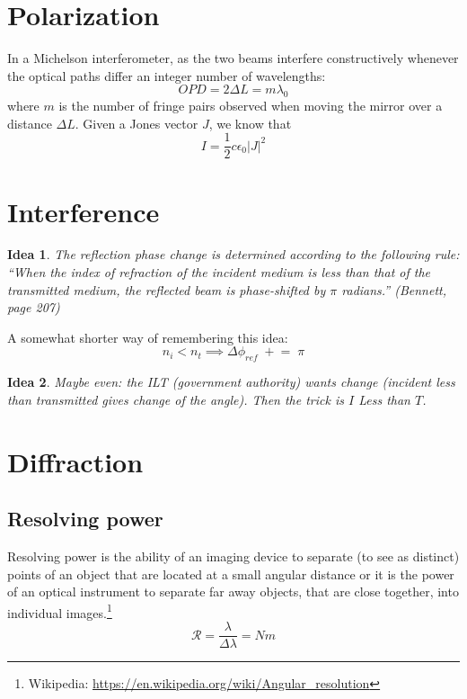 \documentclass{article}
\newtheorem*{idea}{Idea}
\begin{document}
\section{Polarization}
\noindent{}In a Michelson interferometer, as the two beams interfere constructively whenever the optical paths differ an integer number of wavelengths: $$OPD=2\Delta L = m \lambda_0$$
where $m$ is the number of fringe pairs observed when moving the mirror over a distance $\Delta L$.
\newline\newline
Given a Jones vector $J$, we know that
\begin{equation}
    I=\frac{1}{2} c \epsilon_0 \left|J\right|^2
\end{equation}
\iffalse
\noindent
A wave plate is defined to change the polarization state of a wave passing through it.
This means that the definition of a half-wave plate, for example, is that it changes the polarization angle of the light along the slow axis by $\pi$.
The definition \textbf{does not} state that a delay of $\frac{1}{2}\lambda$ is induced along the slow axis (although this is usually the case (especially, the plate does not induce a delay of $\frac{1}{2}\lambda_0$).
\fi
\section{Interference}
\begin{idea}
The reflection phase change is determined according to the following rule:
``When the index of refraction of the incident medium is less than that of the transmitted medium, the reflected beam is phase-shifted by $\pi$ radians.'' (Bennett, page 207)
\end{idea}
\noindent{}A somewhat shorter way of remembering this idea:
$$n_i<n_t\implies \Delta\phi_{ref} \; + \! = \; \pi$$
\begin{idea}
Maybe even: the ILT (government authority) wants change (incident less than transmitted gives change of the angle).
Then the trick is $I$ Less than $T$.
\end{idea}
\section{Diffraction}
\subsection{Resolving power}
Resolving power is the ability of an imaging device to separate (to see as distinct) points of an object that are located at a small angular distance or it is the power of an optical instrument to separate far away objects, that are close together, into individual images.\footnote{Wikipedia: \url{https://en.wikipedia.org/wiki/Angular_resolution}}
$$\mathcal{R}=\frac{\lambda}{\Delta\lambda}=Nm$$
\end{document}
